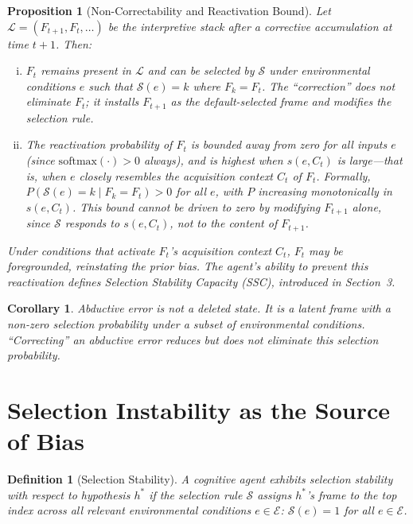 \documentclass[12pt]{article}
\newtheorem{definition}{Definition}
\newtheorem{proposition}{Proposition}
\newtheorem{corollary}{Corollary}
\begin{document}
\begin{proposition}[Non-Correctability and Reactivation Bound]
\label{prop:non-correct}
Let $\mathcal{L} = (F_{t+1}, F_t, \ldots)$ be the interpretive stack
after a corrective accumulation at time $t+1$.
Then:
\begin{enumerate}[(i)]
    \item $F_t$ remains present in $\mathcal{L}$ and can be selected
    by $\mathcal{S}$ under environmental conditions $e$ such that
    $\mathcal{S}(e) = k$ where $F_k = F_t$.
    The ``correction'' does not eliminate $F_t$; it installs $F_{t+1}$
    as the default-selected frame and modifies the selection rule.
    \item The reactivation probability of $F_t$ is bounded away from
    zero for all inputs $e$ (since $\mathrm{softmax}(\cdot) > 0$
    always), and is highest when $s(e, C_t)$ is large---that is,
    when $e$ closely resembles the acquisition context $C_t$ of $F_t$.
    Formally, $P(\mathcal{S}(e) = k \mid F_k = F_t) > 0$ for all $e$,
    with $P$ increasing monotonically in $s(e, C_t)$.
    This bound cannot be driven to zero by modifying $F_{t+1}$
    alone, since $\mathcal{S}$ responds to $s(e, C_t)$,
    not to the content of $F_{t+1}$.
\end{enumerate}
Under conditions that activate $F_t$'s acquisition context $C_t$,
$F_t$ may be foregrounded, reinstating the prior bias. The agent's
ability to prevent this reactivation defines Selection Stability
Capacity (SSC), introduced in Section~3.
\end{proposition}

\begin{corollary}
Abductive error is not a deleted state.
It is a latent frame with a non-zero selection probability under
a subset of environmental conditions.
``Correcting'' an abductive error reduces but does not eliminate
this selection probability.
\end{corollary}

\section{Selection Instability as the Source of Bias}

\begin{definition}[Selection Stability]
A cognitive agent exhibits \emph{selection stability} with respect
to hypothesis $h^*$ if the selection rule $\mathcal{S}$ assigns
$h^*$'s frame to the top index across all relevant environmental
conditions $e \in \mathcal{E}$:
$\mathcal{S}(e) = 1$ for all $e \in \mathcal{E}$.
\end{definition}
\end{document}
